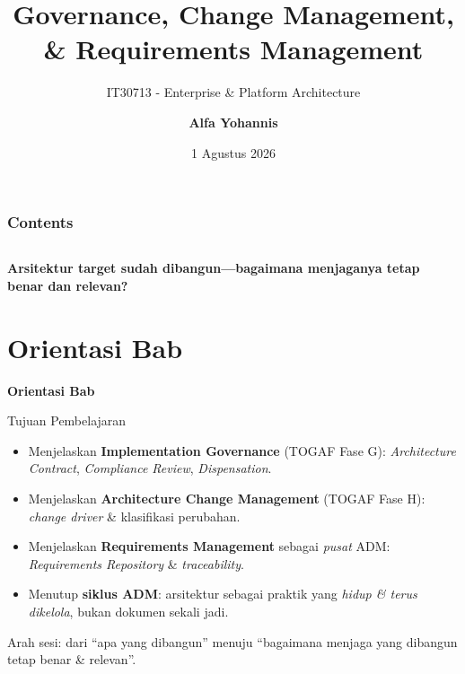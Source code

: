 \documentclass[aspectratio=169, table]{beamer}
\title{\LARGE Governance, Change Management,\\
  \vspace{4pt}
  \& Requirements Management}
\subtitle{IT30713 - Enterprise \& Platform Architecture}
\author{\textbf{Alfa Yohannis}}
\date{1 Agustus 2026}
\newcommand{\sectionframe}[1]{%
  \begin{frame}{\hfill}
    \centering
    \Huge{\textbf{#1}}
  \end{frame}
}
\newcommand{\takeaway}[1]{%
  \vspace{4pt}
  {\footnotesize #1}
}
\begin{document}
\frame{\titlepage}

\begin{frame}[fragile]
  \frametitle{Contents}
  \vspace{20pt}
  \begin{columns}[t]
    \tableofcontents[sections={1-4}]

    \tableofcontents[sections={5-8}]
  \end{columns}
\end{frame}

\begin{frame}{\hfill}
  \centering
  \Huge{\textbf{Arsitektur target sudah dibangun---bagaimana menjaganya tetap
  benar dan relevan?}}
\end{frame}

\section{Orientasi Bab}
\sectionframe{Orientasi Bab}

\begin{frame}{Tujuan Pembelajaran}
  \vspace{6pt}
  \begin{itemize}
    \item Menjelaskan \textbf{Implementation Governance} (TOGAF Fase G):
          \emph{Architecture Contract}, \emph{Compliance Review}, \emph{Dispensation}.
    \item Menjelaskan \textbf{Architecture Change Management} (TOGAF Fase H):
          \emph{change driver} \& klasifikasi perubahan.
    \item Menjelaskan \textbf{Requirements Management} sebagai \emph{pusat} ADM:
          \emph{Requirements Repository} \& \emph{traceability}.
    \item Menutup \textbf{siklus ADM}: arsitektur sebagai praktik yang \emph{hidup
          \& terus dikelola}, bukan dokumen sekali jadi.
  \end{itemize}
  \takeaway{Arah sesi: dari ``apa yang dibangun'' menuju ``bagaimana menjaga yang
  dibangun tetap benar \& relevan''.}
\end{frame}
\end{document}
